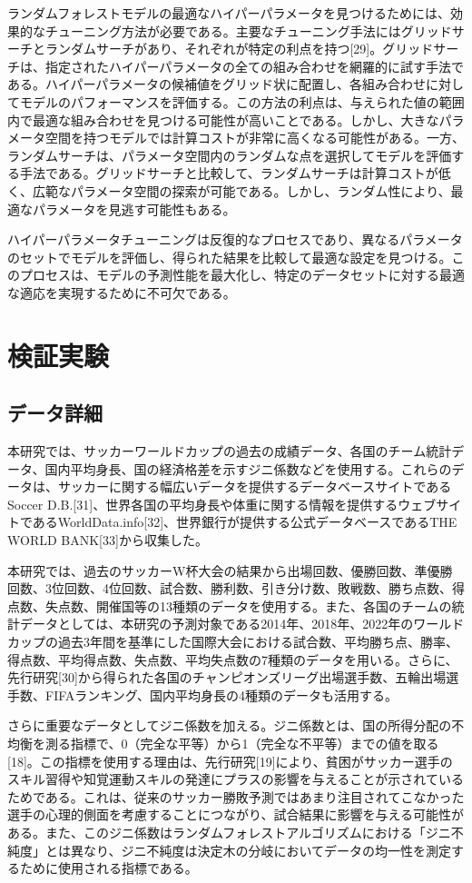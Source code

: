 \documentclass[platex]{suribt}
\begin{document}
ランダムフォレストモデルの最適なハイパーパラメータを見つけるためには、効果的なチューニング方法が必要である。主要なチューニング手法にはグリッドサーチとランダムサーチがあり、それぞれが特定の利点を持つ[29]。グリッドサーチは、指定されたハイパーパラメータの全ての組み合わせを網羅的に試す手法である。ハイパーパラメータの候補値をグリッド状に配置し、各組み合わせに対してモデルのパフォーマンスを評価する。この方法の利点は、与えられた値の範囲内で最適な組み合わせを見つける可能性が高いことである。しかし、大きなパラメータ空間を持つモデルでは計算コストが非常に高くなる可能性がある。一方、ランダムサーチは、パラメータ空間内のランダムな点を選択してモデルを評価する手法である。グリッドサーチと比較して、ランダムサーチは計算コストが低く、広範なパラメータ空間の探索が可能である。しかし、ランダム性により、最適なパラメータを見逃す可能性もある。

ハイパーパラメータチューニングは反復的なプロセスであり、異なるパラメータのセットでモデルを評価し、得られた結果を比較して最適な設定を見つける。このプロセスは、モデルの予測性能を最大化し、特定のデータセットに対する最適な適応を実現するために不可欠である。


\chapter{検証実験}
\section{データ詳細}
本研究では、サッカーワールドカップの過去の成績データ、各国のチーム統計データ、国内平均身長、国の経済格差を示すジニ係数などを使用する。これらのデータは、サッカーに関する幅広いデータを提供するデータベースサイトであるSoccer D.B.[31]、世界各国の平均身長や体重に関する情報を提供するウェブサイトであるWorldData.info[32]、世界銀行が提供する公式データベースであるTHE WORLD BANK[33]から収集した。

本研究では、過去のサッカーW杯大会の結果から出場回数、優勝回数、準優勝回数、3位回数、4位回数、試合数、勝利数、引き分け数、敗戦数、勝ち点数、得点数、失点数、開催国等の13種類のデータを使用する。また、各国のチームの統計データとしては、本研究の予測対象である2014年、2018年、2022年のワールドカップの過去3年間を基準にした国際大会における試合数、平均勝ち点、勝率、得点数、平均得点数、失点数、平均失点数の7種類のデータを用いる。さらに、先行研究[30]から得られた各国のチャンピオンズリーグ出場選手数、五輪出場選手数、FIFAランキング、国内平均身長の4種類のデータも活用する。

さらに重要なデータとしてジニ係数を加える。ジニ係数とは、国の所得分配の不均衡を測る指標で、0（完全な平等）から1（完全な不平等）までの値を取る[18]。この指標を使用する理由は、先行研究[19]により、貧困がサッカー選手のスキル習得や知覚運動スキルの発達にプラスの影響を与えることが示されているためである。これは、従来のサッカー勝敗予測ではあまり注目されてこなかった選手の心理的側面を考慮することにつながり、試合結果に影響を与える可能性がある。また、このジニ係数はランダムフォレストアルゴリズムにおける「ジニ不純度」とは異なり、ジニ不純度は決定木の分岐においてデータの均一性を測定するために使用される指標である。
\end{document}
